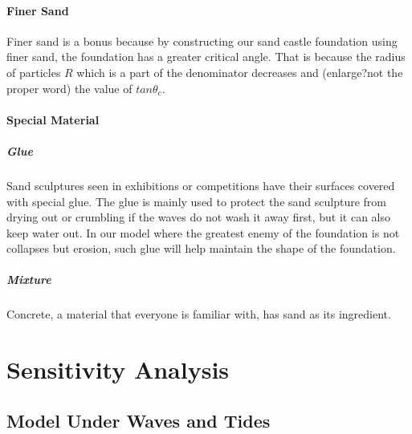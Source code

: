 \documentclass[12pt]{article}
\begin{document}
\paragraph{Finer Sand}
Finer sand is a bonus because by constructing our sand castle foundation using finer sand, the foundation has a greater critical angle. That is because the radius of particles $R$ which is a part of the denominator decreases and (enlarge?not the proper word) the value of $tan\theta_c$.
\paragraph{Special Material}
\subparagraph{Glue}
Sand sculptures seen in exhibitions or competitions have their surfaces covered with special glue. The glue is mainly used to protect the sand sculpture from drying out or crumbling if the waves do not wash it away first, but it can also keep water out. In our model where the greatest enemy of the foundation is not collapses but erosion, such glue will help maintain the shape of the foundation.
\subparagraph{Mixture}
Concrete, a material that everyone is familiar with, has sand as its ingredient.

\section{Sensitivity Analysis}
\subsection{Model Under Waves and Tides}
\end{document}
